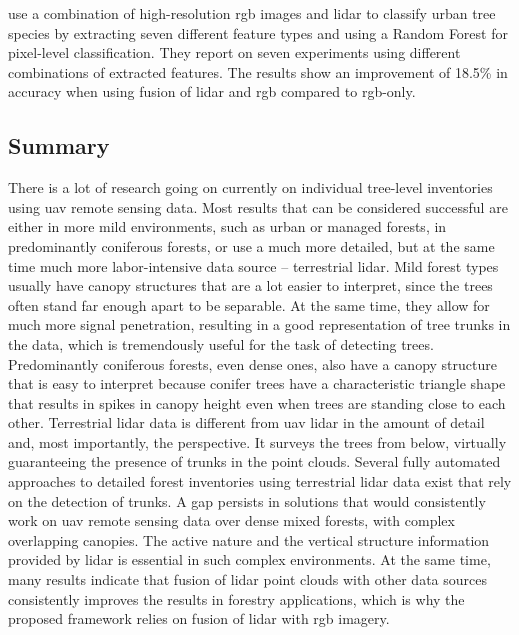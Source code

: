 \citet{wuFineClassificationUrban2024} use a combination of high-resolution \gls{rgb} images and \gls{lidar} to classify urban tree species by extracting seven different feature types and using a Random Forest for pixel-level classification.
They report on seven experiments using different combinations of extracted features.
The results show an improvement of 18.5\% in accuracy when using fusion of \gls{lidar} and \gls{rgb} compared to \gls{rgb}-only.


\subsection{Summary}

There is a lot of research going on currently on individual tree-level inventories using \gls{uav} remote sensing data.
Most results that can be considered successful are either in more mild environments, such as urban or managed forests, in predominantly coniferous forests, or use a much more detailed, but at the same time much more labor-intensive data source – terrestrial \gls{lidar}.
Mild forest types usually have canopy structures that are a lot easier to interpret, since the trees often stand far enough apart to be separable.
At the same time, they allow for much more signal penetration, resulting in a good representation of tree trunks in the data, which is tremendously useful for the task of detecting trees.
Predominantly coniferous forests, even dense ones, also have a canopy structure that is easy to interpret because conifer trees have a characteristic triangle shape that results in spikes in canopy height even when trees are standing close to each other.
Terrestrial \gls{lidar} data is different from \gls{uav} \gls{lidar} in the amount of detail and, most importantly, the perspective.
It surveys the trees from below, virtually guaranteeing the presence of trunks in the point clouds.
Several fully automated approaches to detailed forest inventories using terrestrial \gls{lidar} data exist that rely on the detection of trunks.
A gap persists in solutions that would consistently work on \gls{uav} remote sensing data over dense mixed forests, with complex overlapping canopies.
The active nature and the vertical structure information provided by \gls{lidar} is essential in such complex environments.
At the same time, many results indicate that fusion of \gls{lidar} point clouds with other data sources consistently improves the results in forestry applications, which is why the proposed framework relies on fusion of \gls{lidar} with \gls{rgb} imagery.
